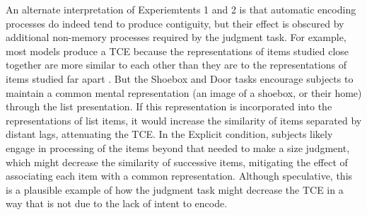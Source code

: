 \documentclass[jou,natbib]{apa6} %
\begin{document}
 An alternate interpretation of Experiemtents 1 and 2 is that automatic encoding processes do indeed tend to produce contiguity, but their effect is obscured by additional non-memory processes required by the judgment task. For example, most models produce a TCE because the representations of items studied close together are more similar to each other than they are to the representations of items studied far apart  \citep{}. But the Shoebox and Door tasks encourage subjects to maintain a common mental representation (an image of a shoebox, or their home) through the list presentation. If this representation is incorporated into the representations of list items, it would increase the similarity of items separated by distant lags, attenuating the TCE. In the Explicit condition, subjects likely engage in processing of the items beyond that needed to make a size judgment, which might decrease the similarity of successive items, mitigating the effect of associating each item with a common representation. Although speculative, this is a plausible example of how the judgment task might decrease the TCE in a way that is not due to the lack of intent to encode. %



\end{document}

